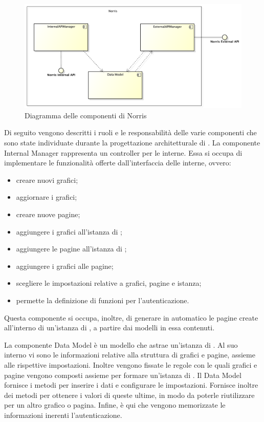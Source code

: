     	\begin{figure}[H]\centering
	        \includegraphics[width=\textwidth]{SpecificaTecnica/Pics/ComponentiNorris}
	        \caption{Diagramma delle componenti di Norris}
	    \end{figure}
    	Di seguito vengono descritti i ruoli e le responsabilità delle varie componenti che sono state individuate durante la progettazione architetturale di .
			La componente Internal  Manager rappresenta un controller per le  interne. Essa si occupa di implementare le funzionalità offerte dall'interfaccia delle  interne, ovvero:
			\begin{itemize}
				\item creare nuovi grafici;
				\item aggiornare i grafici;
				\item creare nuove pagine;
				\item aggiungere i grafici all'istanza di ;
				\item aggiungere le pagine all'istanza di ;
				\item aggiungere i grafici alle pagine;
				\item scegliere le impostazioni relative a grafici, pagine e istanza;
				\item permette la definizione di funzioni per l'autenticazione.
			\end{itemize}
		Questa componente si occupa, inoltre, di generare in automatico le pagine create all'interno di un'istanza di , a partire dai modelli in essa contenuti.

			La componente Data Model è un modello che astrae un'istanza di . Al suo interno vi sono le informazioni relative alla struttura di grafici e pagine, assieme alle rispettive impostazioni. Inoltre vengono fissate le regole con le quali grafici e pagine vengono composti assieme per formare un'istanza di . Il Data Model fornisce i metodi per inserire i dati e configurare le impostazioni. Fornisce inoltre dei metodi per ottenere i valori di queste ultime, in modo da poterle riutilizzare per un altro grafico o pagina. Infine, è qui che vengono memorizzate le informazioni inerenti l'autenticazione.

